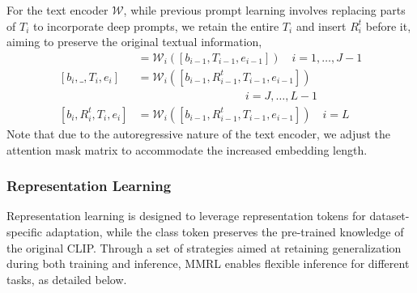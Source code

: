 For the text encoder $\mathcal{W}$, while previous prompt learning \cite{maple} involves replacing parts of $T_i$ to incorporate deep prompts, we retain the entire $T_i$ and insert $R_i^t$ before it, aiming to preserve the original textual information,
\begin{align}
    [b_i, T_i, e_i] &= \mathcal{W}_i([b_{i-1}, T_{i-1}, e_{i-1}]) \quad i = 1, \ldots, J-1 \nonumber \\  
    [b_i, \_, T_i, e_i] &= \mathcal{W}_i([b_{i-1}, R_{i-1}^t, T_{i-1}, e_{i-1}]) \nonumber \\
    &\hspace{4cm} i = J, \ldots, L-1 \nonumber \\
    [b_i, R_i^t, T_i, e_i] &= \mathcal{W}_i([b_{i-1}, R_{i-1}^t, T_{i-1}, e_{i-1}]) \quad i = L \nonumber
\end{align}
Note that due to the autoregressive nature of the text encoder, we adjust the attention mask matrix to accommodate the increased embedding length.


\subsubsection{Representation Learning}
Representation learning is designed to leverage representation tokens for dataset-specific adaptation, while the class token preserves the pre-trained knowledge of the original CLIP. Through a set of strategies aimed at retaining generalization during both training and inference, MMRL enables flexible inference for different tasks, as detailed below.


